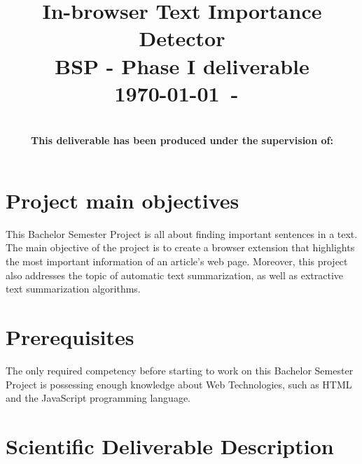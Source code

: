 \documentclass[conference,compsoc]{IEEEtran}
\begin{document}
\title{In-browser Text Importance Detector\\
BSP - Phase I deliverable\\
{\small \today~-~\currenttime}}


\author{
\\
{\bf This deliverable has been produced under the supervision of:}\\
%
}

\maketitle




\section{Project main objectives}

This Bachelor Semester Project is all about finding important sentences in a text. The main objective of the project is to create a browser extension that highlights the most important information of an article's web page. Moreover, this project also addresses the topic of automatic text summarization, as well as extractive text summarization algorithms.

\section{Prerequisites}

The only required competency before starting to work on this Bachelor Semester Project is possessing enough knowledge about Web Technologies, such as HTML and the JavaScript programming language.


\section{Scientific Deliverable Description}
\end{document}
